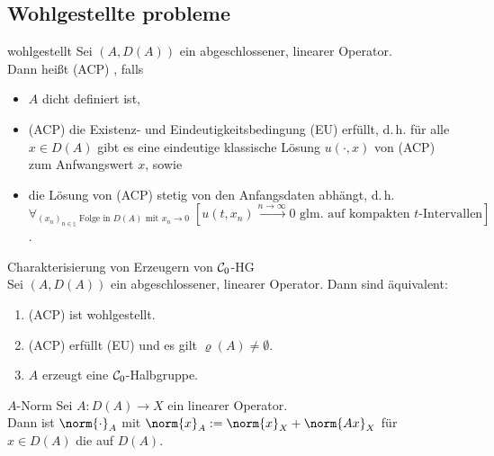 \subsection{%
    Wohlgestellte probleme%
}

\begin{Def}{wohlgestellt}
    Sei $(A, D(A))$ ein abgeschlossener, linearer Operator.\\
    Dann heißt (ACP) , falls
    \begin{itemize}
        \item
        $A$ dicht definiert ist,

        \item
        (ACP) die Existenz- und Eindeutigkeitsbedingung (EU) erfüllt, d.\,h.
        für alle $x \in D(A)$ gibt es eine eindeutige klassische Lösung
        $u(\cdot, x)$ von (ACP) zum Anfwangswert $x$, sowie

        \item
        die Lösung von (ACP) stetig von den Anfangsdaten abhängt, d.\,h.\\
        $\forall_{\text{$(x_n)_{n \in \natural}$ Folge in $D(A)$ mit $x_n \to 0$}}\;
        [\text{$u(t, x_n) \xrightarrow{n \to \infty} 0$ glm. auf kompakten $t$-Intervallen}]$.
    \end{itemize}
\end{Def}

\begin{Satz}{Charakterisierung von Erzeugern von $\mathcal{C}_0$-HG}\\
    Sei $(A, D(A))$ ein abgeschlossener, linearer Operator.
    Dann sind äquivalent:
    \begin{enumerate}
        \item
        (ACP) ist wohlgestellt.

        \item
        (ACP) erfüllt (EU) und es gilt $\varrho(A) \not= \emptyset$.

        \item
        $A$ erzeugt eine $\mathcal{C}_0$-Halbgruppe.
    \end{enumerate}
\end{Satz}

\linie

\begin{Def}{$A$-Norm}
    Sei $A\colon D(A) \to X$ ein linearer Operator.\\
    Dann ist $\norm{\cdot}_A$ mit $\norm{x}_A := \norm{x}_X + \norm{Ax}_X$ für $x \in D(A)$
    die  auf $D(A)$.
\end{Def}

